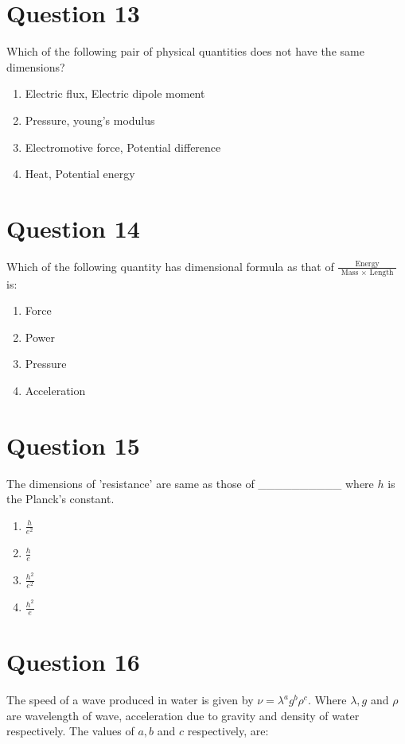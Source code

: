 \documentclass{article}
\begin{document}
\section*{Question 13}
Which of the following pair of physical quantities does not have the same dimensions?
\begin{enumerate}[label=(\alph*)]
\item Electric flux, Electric dipole moment\newline
\item Pressure, young's modulus
\item Electromotive force, Potential difference
\item Heat, Potential energy
\end{enumerate}
\newpage
\section*{Question 14}
Which of the following quantity has dimensional formula as that of \(\frac{\text { Energy }}{\text { Mass } \times \text { Length }}\) is:
\begin{enumerate}[label=(\alph*)]
\item Force
\item Power
\item Pressure
\item Acceleration
\end{enumerate}
\newpage
\section*{Question 15}
The dimensions of 'resistance' are same as those of __________ where \(h\) is the Planck's constant.
\begin{enumerate}[label=(\alph*)]
\item \(\frac{h}{e^2}\)
\item \(\frac{h}{e}\)
\item \(\frac{h^2}{e^2}\)\newline
\item \(\frac{h^2}{e}\)
\end{enumerate}
\newpage
\section*{Question 16}
The speed of a wave produced in water is given by \(\nu=\lambda^a g^{b} \rho^{c}\). Where \(\lambda, g\) and \(\rho\) are wavelength of wave, acceleration due to gravity and density of water respectively. The values of \(a, b\) and \(c\) respectively, are: 
\begin{enumerate}[label=(\alph*)]
\end{enumerate}
\newpage
\end{document}
